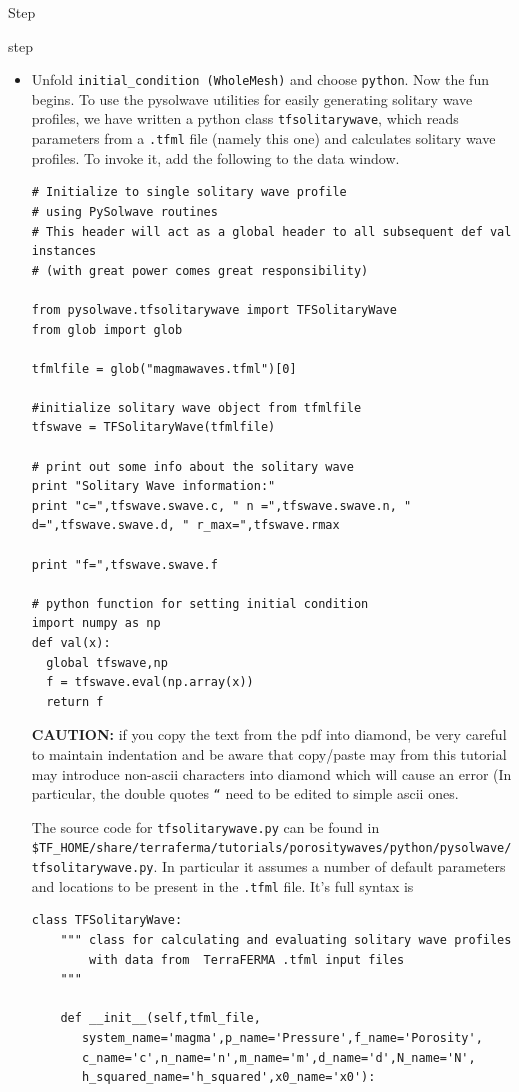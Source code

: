 \begin{steps}{Step}
\begin{steps}{step}
\begin{itemize}
    \item Unfold \texttt{initial\_condition (WholeMesh)} and choose
      \texttt{python}.  Now the fun begins. To use the pysolwave
      utilities for easily generating solitary wave profiles,  we have
      written a python class \texttt{tfsolitarywave},  which reads
      parameters from a \texttt{.tfml} file (namely this one) and
      calculates solitary wave profiles.  To invoke it, add the
      following to the data window.
      \begin{lstlisting}[style=Python]
# Initialize to single solitary wave profile 
# using PySolwave routines 
# This header will act as a global header to all subsequent def val instances
# (with great power comes great responsibility)

from pysolwave.tfsolitarywave import TFSolitaryWave
from glob import glob

tfmlfile = glob("magmawaves.tfml")[0]

#initialize solitary wave object from tfmlfile
tfswave = TFSolitaryWave(tfmlfile)

# print out some info about the solitary wave 
print "Solitary Wave information:"
print "c=",tfswave.swave.c, " n =",tfswave.swave.n, " d=",tfswave.swave.d, " r_max=",tfswave.rmax

print "f=",tfswave.swave.f

# python function for setting initial condition
import numpy as np
def val(x):
  global tfswave,np
  f = tfswave.eval(np.array(x))
  return f
\end{lstlisting}
\textbf{CAUTION:} if you copy the text from the pdf into diamond, be
very careful to maintain indentation and be aware that copy/paste may
from this tutorial may introduce non-ascii characters into diamond
which will cause an error (In particular, the double quotes
\texttt{``} need to be edited to simple ascii ones.

The source code for \texttt{tfsolitarywave.py} can be found in
\texttt{\$TF\_HOME/share/terraferma/tutorials/porositywaves/python/pysolwave/tfsolitarywave.py}. In
particular it assumes a number of default parameters and locations to
be present in the \texttt{.tfml} file.  It's full syntax is
\begin{lstlisting}[style=Python]
class TFSolitaryWave:
    """ class for calculating and evaluating solitary wave profiles
        with data from  TerraFERMA .tfml input files
    """

    def __init__(self,tfml_file,
       system_name='magma',p_name='Pressure',f_name='Porosity',
       c_name='c',n_name='n',m_name='m',d_name='d',N_name='N',
       h_squared_name='h_squared',x0_name='x0'):
        

\end{lstlisting}
\end{itemize}
\end{steps}
\end{steps}
